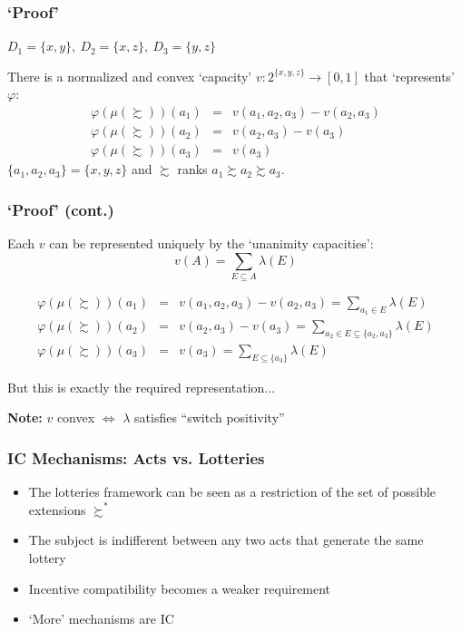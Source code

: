 \begin{frame}
  \frametitle{`Proof'}

$D_1=\{x,y\},~ D_2=\{x,z\},~ D_3=\{y,z\}$

\bigskip
\bigskip

There is a normalized and convex `capacity' $v:2^{\{x,y,z\}} \rightarrow [0,1]$ that `represents' $\varphi$:
\begin{eqnarray*}
\varphi(\mu(\succsim))(a_1) &=& v(a_1,a_2,a_3)-v(a_2,a_3)\\
\varphi(\mu(\succsim))(a_2) &=& v(a_2,a_3)-v(a_3)\\
\varphi(\mu(\succsim))(a_3) &=& v(a_3)
\end{eqnarray*}
$\{a_1,a_2,a_3\}=\{x,y,z\}$ and $\succsim$ ranks $a_1\succsim a_2 \succsim a_3$.


\end{frame}


\begin{frame}
  \frametitle{`Proof' (cont.)}

%

Each $v$ can be represented uniquely by the `unanimity capacities':
$$v(A) = \sum_{E\subseteq A} \lambda (E)$$


\begin{eqnarray*}
\varphi(\mu(\succsim))(a_1) &=& v(a_1,a_2,a_3)-v(a_2,a_3) = \sum_{a_1\in E} \lambda(E)\\
\varphi(\mu(\succsim))(a_2) &=& v(a_2,a_3)-v(a_3) = \sum_{a_2\in E\subseteq \{a_2,a_3\}} \lambda(E)\\
\varphi(\mu(\succsim))(a_3) &=& v(a_3) = \sum_{E\subseteq \{a_3\}} \lambda(E)
\end{eqnarray*}

But this is exactly the required representation...

\bigskip

\textbf{Note:} $v$ convex $\Leftrightarrow$ $\lambda$ satisfies ``switch positivity''

\end{frame}




\begin{frame}
  \frametitle{IC Mechanisms: Acts vs. Lotteries}

\begin{itemize}
\item The lotteries framework can be seen as a restriction of the set of possible extensions $\succsim^*$

\item The subject is indifferent between any two acts that generate the same lottery

\item Incentive compatibility becomes a weaker requirement

\item `More' mechanisms are IC
\end{itemize}

\end{frame}


